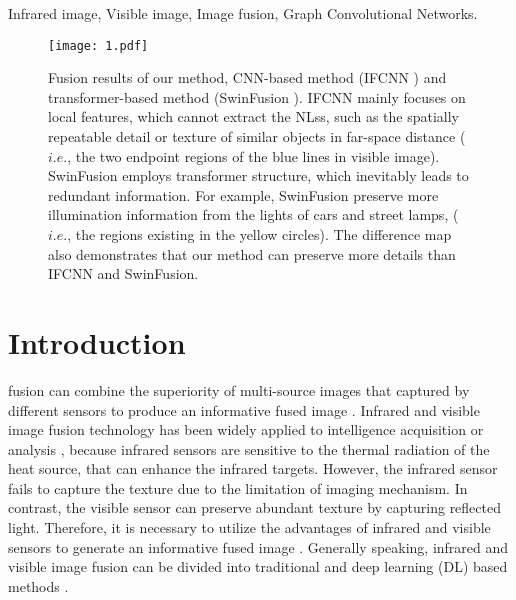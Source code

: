 \documentclass[journal]{IEEEtran}
\begin{document}
\begin{IEEEkeywords}
 Infrared image, Visible image, Image fusion, Graph Convolutional Networks.
\end{IEEEkeywords}






%
\IEEEpeerreviewmaketitle

\begin{figure}[!t]
\centering
\texttt{[image: 1.pdf]}
\caption{Fusion results of our method, CNN-based method (IFCNN \cite{ zhang2020ifcnn }) and transformer-based method (SwinFusion \cite{ma2022swinfusion}). IFCNN mainly focuses on local features, which cannot extract the NLss, such as the spatially repeatable detail or texture of similar objects in far-space distance ($i.e.$, the two endpoint regions of the blue lines in visible image). SwinFusion employs transformer structure, which inevitably leads to redundant information. For example, SwinFusion preserve more illumination information from the lights of cars and street lamps, ($i.e.$, the regions existing in the yellow circles). The difference map also demonstrates that our method can preserve more details than IFCNN and SwinFusion.}
\label{FIG:1}
\end{figure}

\section{Introduction}
 fusion can combine the superiority of multi-source images that captured by
different sensors to produce an informative fused image \cite{karim2022current,zhang2023visible}. Infrared and visible image fusion technology has been widely applied to intelligence acquisition or analysis \cite{ma2019infrared,tang2023datfuse,li2017pixel,ma2019locality,liu2018deep}, because infrared sensors are sensitive to the thermal radiation of the heat source, that can enhance the infrared targets. However, the infrared sensor fails to capture the texture due to the limitation of imaging mechanism. In contrast, the visible sensor can preserve abundant texture by capturing reflected light. Therefore, it is necessary to utilize the advantages of infrared and visible sensors to generate an informative fused image \cite{xu2020u2fusion,tang2022superfusion,zhou2021semantic}. Generally speaking, infrared and visible image fusion can be divided into traditional and deep learning (DL) based methods \cite{li2020attentionfgan,li2019coupled}.
\end{document}
